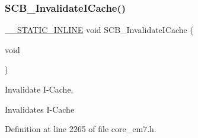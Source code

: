 \subsubsection{\texorpdfstring{S\+C\+B\+\_\+\+Invalidate\+I\+Cache()}{SCB\_InvalidateICache()}}
{\footnotesize\ttfamily \hyperlink{cmsis__iccarm_8h_aba87361bfad2ae52cfe2f40c1a1dbf9c}{\+\_\+\+\_\+\+S\+T\+A\+T\+I\+C\+\_\+\+I\+N\+L\+I\+NE} void S\+C\+B\+\_\+\+Invalidate\+I\+Cache (\begin{DoxyParamCaption}\item[{void}]{ }\end{DoxyParamCaption})}



Invalidate I-\/\+Cache. 

Invalidates I-\/\+Cache 

Definition at line 2265 of file core\+\_\+cm7.\+h.

